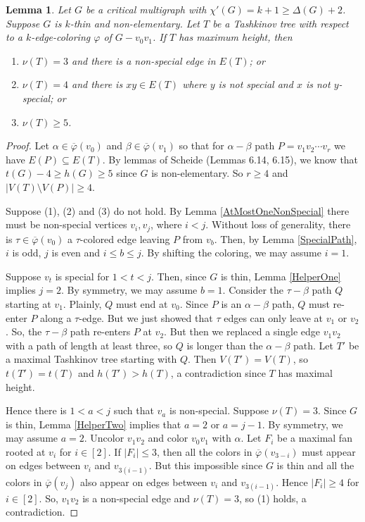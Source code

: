 \documentclass[12pt]{amsart}
\theoremstyle{plain}
\newtheorem{lem}[thm]{Lemma}
\theoremstyle{definition}
\theoremstyle{remark}
\newcommand{\card}[1]{\left|#1\right|}
\newcommand{\irange}[1]{\left[#1\right]}
\newcommand{\vph}{\varphi}
\newcommand{\vphn}{\overline{\varphi}}
\begin{document}
\begin{lem}\label{AtMostThreeNonSpecial}
Let $G$ be a critical multigraph with $\chi'(G) = k + 1 \ge \Delta(G) + 2$. Suppose $G$ is $k$-thin and non-elementary. Let $T$ be a Tashkinov tree with respect to a $k$-edge-coloring
$\vph$ of $G - v_0v_1$. If $T$ has maximum height, then 
\begin{enumerate}
\item $\nu(T) = 3$ and there is a non-special edge in $E(T)$; or
\item $\nu(T) = 4$ and there is $xy \in E(T)$ where $y$ is not special and $x$ is not $y$-special; or
\item $\nu(T) \ge 5$.
\end{enumerate}
\end{lem}
\begin{proof}
Let $\alpha \in \vphn(v_0)$ and $\beta \in \vphn(v_1)$ so that for $\alpha-\beta$ path $P = v_1v_2\cdots v_r$ we have $E(P) \subseteq E(T)$.  
By lemmas of Scheide (Lemmas 6.14, 6.15), we know that $t(G) - 4 \ge h(G) \ge 5$ since $G$ is non-elementary.  So $r \ge 4$ and $\card{V(T) \setminus V(P)} \ge 4$.

Suppose (1), (2) and (3) do not hold.  By Lemma \ref{AtMostOneNonSpecial} there must be non-special vertices $v_i, v_j$, where $i < j$.  Without loss of generality, 
there is $\tau \in \vphn(v_0)$ a $\tau$-colored edge leaving $P$ from $v_b$.  Then, by Lemma \ref{SpecialPath}, $i$ is odd, $j$ is even and $i \le b \le j$.  By shifting the coloring, we may assume $i = 1$.

Suppose $v_t$ is special for $1 < t < j$.  Then, since $G$ is thin, Lemma \ref{HelperOne} implies $j = 2$.  By symmetry, we may assume $b = 1$.  Consider the $\tau-\beta$ path $Q$ starting at $v_1$.  
Plainly, $Q$ must end at $v_0$. Since $P$ is an $\alpha-\beta$ path, $Q$ must re-enter $P$ along a $\tau$-edge.
But we just showed that $\tau$ edges can only leave at $v_1$ or $v_2$.  So, the $\tau-\beta$ path re-enters $P$ at $v_2$.  But then we replaced a single edge $v_1v_2$ with a path of length at least three, 
so $Q$ is longer than the $\alpha-\beta$ path.  Let $T'$ be a maximal Tashkinov tree starting with $Q$.  Then $V(T') = V(T)$, so $t(T') = t(T)$ and $h(T') > h(T)$, a contradiction since $T$ has maximal height.

Hence there is $1 < a < j$ such that $v_a$ is non-special.  Suppose $\nu(T) = 3$. Since $G$ is thin, Lemma \ref{HelperTwo} implies that $a = 2$ or $a = j-1$.  
By symmetry, we may assume $a=2$.  Uncolor $v_1v_2$ and color $v_0v_1$ with $\alpha$.  Let $F_i$ be a maximal fan rooted at $v_i$ for $i \in \irange{2}$.  If $|F_i| \le 3$, then all the colors in $\vphn(v_{3-i})$
must appear on edges between $v_i$ and $v_{3(i-1)}$.  But this impossible since $G$ is thin and all the colors in $\vphn(v_j)$ also appear on edges between $v_i$ and $v_{3(i-1)}$.  
Hence $|F_i| \ge 4$ for $i \in \irange{2}$.  So, $v_1v_2$ is a non-special edge and $\nu(T) = 3$, so (1) holds, a contradiction.


\end{proof}
\end{document}
